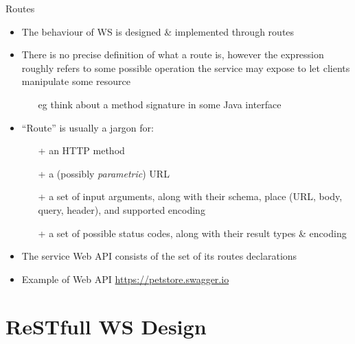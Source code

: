 \documentclass[presentation]{beamer}\mode<presentation>{\usetheme{AMSCesenaPurpleAndGold}}
\begin{document}
\begin{frame}{Routes}
    
    \begin{itemize}
        \item The behaviour of WS is designed \& implemented through \alert{routes}
        
        \vfill
        
        \item There is no precise definition of what a route is, however the expression roughly refers to some \alert{possible operation} the service may expose to let clients manipulate some \alert{resource}
        \begin{itemize}
            \item[eg] think about a method signature in some Java interface
        \end{itemize}
        
        \vfill
        
        \item ``Route'' is usually a \alert{jargon} for:
        \begin{itemize}
            \item[+] an HTTP \alert{method}
            
            \item[+] a (possibly \emph{parametric}) URL
            
            \item[+] a set of input arguments, along with their schema, place (URL, body, query, header), and supported encoding
            
            \item[+] a set of possible status codes, along with their result types \& encoding
        \end{itemize}
        
        \vfill
        
        \item The service \alert{Web API} consists of the set of its routes declarations
        
        \vfill
        
        \item Example of \alert{Web API} \url{https://petstore.swagger.io}
    \end{itemize}
    
\end{frame}

\section{ReSTfull WS Design}
\end{document}
